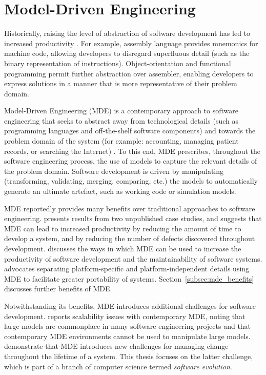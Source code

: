 
\section{Model-Driven Engineering}
Historically, raising the level of abstraction of software development has led to increased productivity \cite{brooks86nosilverbullet}. For example, assembly language provides mnemonics for machine code, allowing developers to disregard superfluous detail (such as the binary representation of instructions). Object-orientation and functional programming permit further abstraction over assembler, enabling developers to express solutions in a manner that is more representative of their problem domain.

Model-Driven Engineering (MDE) is a contemporary approach to software engineering that seeks to abstract away from technological details (such as programming languages and off-the-shelf software components) and towards the problem domain of the system (for example: accounting, managing patient records, or searching the Internet) \cite{frankel02mda,kleppe03mda,selic03pragmatics}. To this end, MDE prescribes, throughout the software engineering process, the use of models to capture the relevant details of the problem domain. Software development is driven by manipulating (transforming, validating, merging, comparing, etc.) the models to automatically generate an ultimate artefact, such as working code or simulation models.

MDE reportedly provides many benefits over traditional approaches to software engineering. \cite{watson08mdahistory} presents results from two unpublished case studies, and suggests that MDE can lead to increased productivity by reducing the amount of time to develop a system, and by reducing the number of defects discovered throughout development. \cite{kleppe03mda} discusses the ways in which MDE can be used to increase the productivity of software development and the maintainability of software systems. \cite{frankel02mda} advocates separating platform-specific and platform-independent details using MDE to facilitate greater portability of systems. Section~\ref{subsec:mde_benefits} discusses further benefits of MDE. 

Notwithstanding its benefits, MDE introduces additional challenges for software development. \cite{kolovos08scalability} reports scalability issues with contemporary MDE, noting that large models are commonplace in many software engineering projects and that contemporary MDE environments cannot be used to manipulate large models. \cite{Mens07} demonstrate that MDE introduces new challenges for managing change throughout the lifetime of a system. This thesis focuses on the latter challenge, which is part of a branch of computer science termed \emph{software evolution}.

